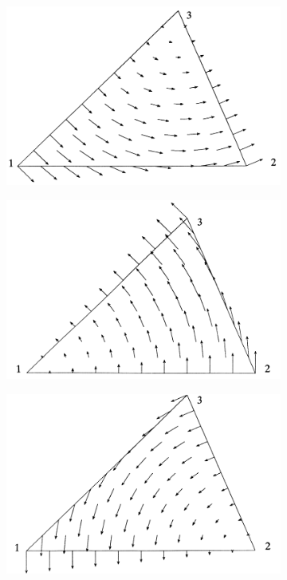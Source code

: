 \begin{figure}[htb]
    \begin{subfigure}{0.32\textwidth}
        \centering
        \includegraphics[width=\linewidth]{figures/Ch2/N1e_.png}
        \caption{}
    \end{subfigure}
    \begin{subfigure}{0.32\textwidth}
        \centering
        \includegraphics[width=\linewidth]{figures/Ch2/N2e_.png}
        \caption{}
    \end{subfigure}
    \begin{subfigure}{0.32\textwidth}
        \centering
        \includegraphics[width=\linewidth]{figures/Ch2/N3e_.png}

\end{subfigure}
\end{figure}
